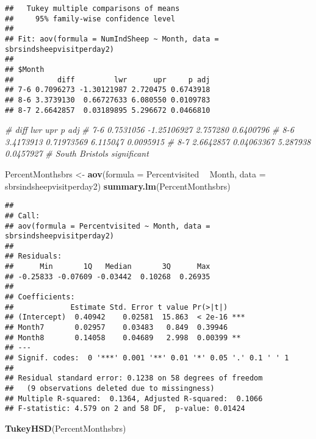 \documentclass[]{article}
\newenvironment{Shaded}{\begin{snugshade}}{\end{snugshade}}
\newcommand{\CommentTok}[1]{\textcolor[rgb]{0.56,0.35,0.01}{\textit{#1}}}
\newcommand{\DataTypeTok}[1]{\textcolor[rgb]{0.13,0.29,0.53}{#1}}
\newcommand{\KeywordTok}[1]{\textcolor[rgb]{0.13,0.29,0.53}{\textbf{#1}}}
\newcommand{\NormalTok}[1]{#1}
\newcommand{\OperatorTok}[1]{\textcolor[rgb]{0.81,0.36,0.00}{\textbf{#1}}}
\newcommand{\StringTok}[1]{\textcolor[rgb]{0.31,0.60,0.02}{#1}}
\begin{document}
\begin{verbatim}
##   Tukey multiple comparisons of means
##     95% family-wise confidence level
## 
## Fit: aov(formula = NumIndSheep ~ Month, data = sbrsindsheepvisitperday2)
## 
## $Month
##          diff         lwr      upr     p adj
## 7-6 0.7096273 -1.30121987 2.720475 0.6743918
## 8-6 3.3739130  0.66727633 6.080550 0.0109783
## 8-7 2.6642857  0.03189895 5.296672 0.0466810
\end{verbatim}

\begin{Shaded}
\begin{Highlighting}[]
\CommentTok{#          diff         lwr      upr     p adj}
\CommentTok{# 7-6 0.7531056 -1.25106927 2.757280 0.6400796}
\CommentTok{# 8-6 3.4173913  0.71973569 6.115047 0.0095915}
\CommentTok{# 8-7 2.6642857  0.04063367 5.287938 0.0457927}
\CommentTok{# South Bristols significant}

\NormalTok{PercentMonthsbrs <-}\StringTok{ }\KeywordTok{aov}\NormalTok{(}\DataTypeTok{formula =}\NormalTok{ Percentvisited }\OperatorTok{~}\StringTok{ }\NormalTok{Month, }\DataTypeTok{data =}\NormalTok{ sbrsindsheepvisitperday2)}
\KeywordTok{summary.lm}\NormalTok{(PercentMonthsbrs)}
\end{Highlighting}
\end{Shaded}

\begin{verbatim}
## 
## Call:
## aov(formula = Percentvisited ~ Month, data = sbrsindsheepvisitperday2)
## 
## Residuals:
##      Min       1Q   Median       3Q      Max 
## -0.25833 -0.07609 -0.03442  0.10268  0.26935 
## 
## Coefficients:
##             Estimate Std. Error t value Pr(>|t|)    
## (Intercept)  0.40942    0.02581  15.863  < 2e-16 ***
## Month7       0.02957    0.03483   0.849  0.39946    
## Month8       0.14058    0.04689   2.998  0.00399 ** 
## ---
## Signif. codes:  0 '***' 0.001 '**' 0.01 '*' 0.05 '.' 0.1 ' ' 1
## 
## Residual standard error: 0.1238 on 58 degrees of freedom
##   (9 observations deleted due to missingness)
## Multiple R-squared:  0.1364, Adjusted R-squared:  0.1066 
## F-statistic: 4.579 on 2 and 58 DF,  p-value: 0.01424
\end{verbatim}

\begin{Shaded}
\begin{Highlighting}[]
\KeywordTok{TukeyHSD}\NormalTok{(PercentMonthsbrs)}
\end{Highlighting}
\end{Shaded}
\end{document}
